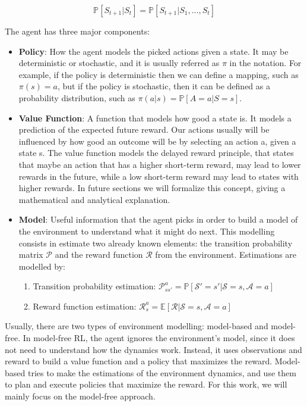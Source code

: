 \begin{equation} \label{past_ind_fut}
	\mathbb{P}[S_{t+1} | S_t] = \mathbb{P}[S_{t+1} | S_1, ..., S_t]
\end{equation}

The agent has three major components:
\begin{itemize}
	\item \textbf{Policy}: How the agent models the picked actions given a state. It may be deterministic or stochastic, and it is usually referred as $\pi$ in the notation. For example, if the policy is deterministic then we can define a mapping, such as $\pi(s)=a$, but if the policy is stochastic, then it can be defined as a probability distribution, such as $\pi(a|s) = \mathbb{P}[A=a|S=s]$.
	\item \textbf{Value Function}: A function that models how good a state is. It models a prediction of the expected future reward. Our actions usually will be influenced by how good an outcome will be by selecting an action a, given a state s. The value function models the delayed reward principle, that states that maybe an action that has a higher short-term reward, may lead to lower rewards in the future, while a low short-term reward may lead to states with higher rewards. In future sections we will formalize this concept, giving a mathematical and analytical explanation.
	\item \textbf{Model}: Useful information that the agent picks in order to build a model of the environment to understand what it might do next. This modelling consists in estimate two already known elements: the transition probability matrix $\mathcal{P}$ and the reward function $\mathcal{R}$ from the environment. Estimations are modelled by:
	\begin{enumerate}
		\item Transition probability estimation: $\mathcal{P}_{s s'}^a = \mathbb{P}[\mathcal{S'} = s' | \mathcal{S} = s, \mathcal{A} = a]$ 
		\item Reward function estimation: $\mathcal{R}_{s}^a = \mathbb{E}[\mathcal{R} | \mathcal{S} = s, \mathcal{A} = a]$ 
	\end{enumerate}
\end{itemize}

Usually, there are two types of environment modelling: model-based and model-free. In model-free RL, the agent ignores the environment's model, since it does not need to understand how the dynamics work. Instead, it uses observations and reward to build a value function and a policy that maximizes the reward. Model-based tries to make the estimations of the environment dynamics, and use them to plan and execute policies that maximize the reward. For this work, we will mainly focus on the model-free approach.

